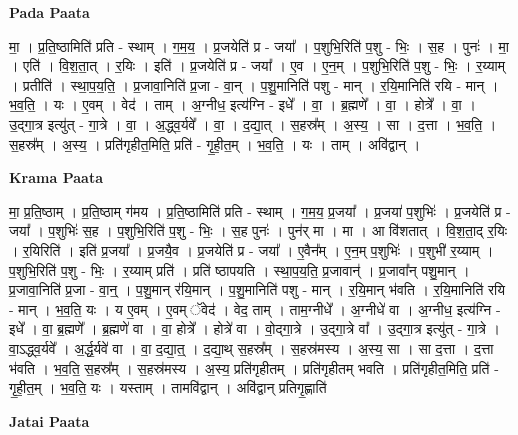 \documentclass[17pt]{extarticle}
\begin{document}
\textbf{Pada Paata} \newline

मा॒ । प्र॒ति॒ष्ठामिति॑ प्रति - स्थाम् । ग॒म॒य॒ । प्र॒जयेति॑ प्र - जया᳚ । प॒शुभि॒रिति॑ प॒शु - भिः॒ । स॒ह । पुनः॑ । मा॒ । एति॑ । वि॒श॒ता॒त् । र॒यिः । इति॑ । प्र॒जयेति॑ प्र - जया᳚ । ए॒व । ए॒न॒म् । प॒शुभि॒रिति॑ प॒शु - भिः॒ । र॒य्याम् । प्रतीति॑ । स्था॒प॒य॒ति॒ । प्र॒जावा॒निति॑ प्र॒जा - वा॒न् । प॒शु॒मानिति॑ पशु - मान् । र॒यि॒मानिति॑ रयि - मान् । भ॒व॒ति॒ । यः । ए॒वम् । वेद॑ । ताम् । अ॒ग्नीध॒ इत्य॑ग्नि - इधे᳚ । वा॒ । ब्र॒ह्मणे᳚ । वा॒ । होत्रे᳚ । वा॒ । उ॒द्गा॒त्र इत्यु॑त् - गा॒त्रे । वा॒ । अ॒द्ध्व॒र्यवे᳚ । वा॒ । द॒द्या॒त् । स॒हस्र᳚म् । अ॒स्य॒ । सा । द॒त्ता । भ॒व॒ति॒ । स॒हस्र᳚म् । अ॒स्य॒ । प्रति॑गृहीत॒मिति॒ प्रति॑ - गृ॒ही॒त॒म् । भ॒व॒ति॒ । यः । ताम् । अवि॑द्वान् ।  \newline


\textbf{Krama Paata} \newline

मा॒ प्र॒ति॒ष्ठाम् । प्र॒ति॒ष्ठाम् ग॑मय । प्र॒ति॒ष्ठामिति॑ प्रति - स्थाम् । ग॒म॒य॒ प्र॒जया᳚ । प्र॒जया॑ प॒शुभिः॑ । प्र॒जयेति॑ प्र - जया᳚ । प॒शुभिः॑ स॒ह । प॒शुभि॒रिति॑ प॒शु - भिः॒ । स॒ह पुनः॑ । पुन॑र् मा । मा । आ वि॑शतात् । वि॒श॒ता॒द् र॒यिः । र॒यिरिति॑ । इति॑ प्र॒जया᳚ । प्र॒जयै॒व । प्र॒जयेति॑ प्र - जया᳚ । ए॒वैन᳚म् । ए॒न॒म् प॒शुभिः॑ । प॒शुभी॑ र॒य्याम् । प॒शुभि॒रिति॑ प॒शु - भिः॒ । र॒य्याम् प्रति॑ । प्रति॑ ष्ठापयति । स्था॒प॒य॒ति॒ प्र॒जावान्॑ । प्र॒जावा᳚न् पशु॒मान् । प्र॒जावा॒निति॑ प्र॒जा - वा॒न्॒ । प॒शु॒मान् र॑यि॒मान् । प॒शु॒मानिति॑ पशु - मान् । र॒यि॒मान् भ॑वति । र॒यि॒मानिति॑ रयि - मान् । भ॒व॒ति॒ यः । य ए॒वम् । ए॒वम् ॅवेद॑ । वेद॒ ताम् । ताम॒ग्नीधे᳚ । अ॒ग्नीधे॑ वा । अ॒ग्नीध॒ इत्य॑ग्नि - इधे᳚ । वा॒ ब्र॒ह्मणे᳚ । ब्र॒ह्मणे॑ वा । वा॒ होत्रे᳚ । होत्रे॑ वा । वो॒द्‍गा॒त्रे । उ॒द्‍गा॒त्रे वा᳚ । उ॒द्‍गा॒त्र इत्यु॑त् - गा॒त्रे । वा॒ऽद्ध्व॒र्यवे᳚ । अ॒र्द्ध॒र्यवे॑ वा । वा॒ द॒द्या॒त्॒ । द॒द्या॒थ् स॒हस्र᳚म् । स॒हस्र॑मस्य । अ॒स्य॒ सा । सा द॒त्ता । द॒त्ता भ॑वति । भ॒व॒ति॒ स॒हस्र᳚म् । स॒हस्र॑मस्य । अ॒स्य॒ प्रति॑गृहीतम् । प्रति॑गृहीतम् भवति । प्रति॑गृहीत॒मिति॒ प्रति॑ - गृ॒ही॒त॒म् । भ॒व॒ति॒ यः । यस्ताम् । तामवि॑द्वान् । अवि॑द्वान् प्रतिगृ॒ह्णाति॑ \newline

\textbf{Jatai Paata} \newline
\end{document}
